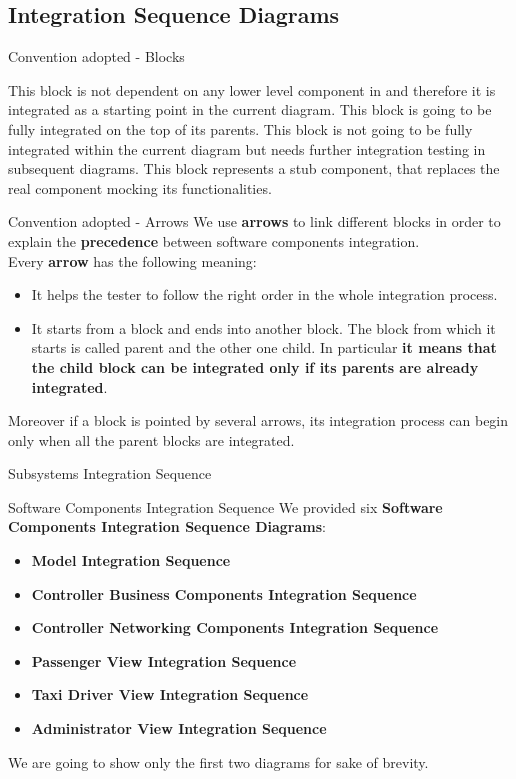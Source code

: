 \documentclass{../common/latex_classes/pdf_presentation}
\begin{document}
	\subsection{Integration Sequence Diagrams}
	\begin{frame}{Convention adopted - Blocks}
		\begin{itemize}
			 This block is not dependent on any lower level component in \myTaxiService{} and therefore it is integrated as a starting point in the current diagram.
			 This block is going to be fully integrated on the top of its parents.
			 This block is not going to be fully integrated within the current diagram but needs further integration testing in subsequent diagrams.
			 This block represents a stub component, that replaces the real component mocking its functionalities.
		\end{itemize}
	\end{frame}
	\begin{frame}{Convention adopted - Arrows}
		We use \textbf{arrows} to link different blocks in order to explain the \textbf{precedence} between software components integration. \\
		\medskip
		Every \textbf{arrow} has the following meaning:
		\begin{itemize}
			\item It helps the tester to follow the right order in the whole integration process.
			\item It starts from a block and ends into another block. The block from which it starts is called parent and the other one child. In particular \textbf{it means that the child block can be integrated only if its parents are already integrated}.
		\end{itemize}
		\medskip
		Moreover if a block is pointed by several arrows, its integration process can begin only when all the parent blocks are integrated.
	\end{frame}
	\begin{frame}{Subsystems Integration Sequence}
		\showPercentImageNoCaption{./itpd1.png}{0.75}
	\end{frame}	
	\begin{frame}{Software Components Integration Sequence}
		We provided six \textbf{Software Components Integration Sequence Diagrams}:
		\begin{itemize}
			\item \textbf{Model Integration Sequence}
			\item \textbf{Controller Business Components Integration Sequence}
			\item \textbf{Controller Networking Components Integration Sequence}
			\item \textbf{Passenger View Integration Sequence}
			\item \textbf{Taxi Driver View Integration Sequence}
			\item \textbf{Administrator View Integration Sequence}
		\end{itemize}
		We are going to show only the first two diagrams for sake of brevity.
	\end{frame}
\end{document}
